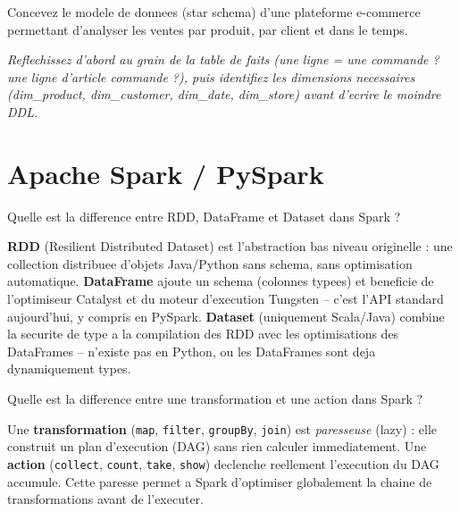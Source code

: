 \documentclass[11pt,a4paper]{article}
\begin{document}
\begin{coding}
Concevez le modele de donnees (star schema) d'une plateforme e-commerce permettant d'analyser les ventes par produit, par client et dans le temps.

\emph{Reflechissez d'abord au grain de la table de faits (une ligne = une commande ? une ligne d'article commande ?), puis identifiez les dimensions necessaires (dim\_product, dim\_customer, dim\_date, dim\_store) avant d'ecrire le moindre DDL.}
\end{coding}

\newpage
\section{Apache Spark / PySpark}

\begin{question} Quelle est la difference entre RDD, DataFrame et Dataset dans Spark ?
\end{question}
\begin{reponse}
\textbf{RDD} (Resilient Distributed Dataset) est l'abstraction bas niveau originelle : une collection distribuee d'objets Java/Python sans schema, sans optimisation automatique. \textbf{DataFrame} ajoute un schema (colonnes typees) et beneficie de l'optimiseur Catalyst et du moteur d'execution Tungsten -- c'est l'API standard aujourd'hui, y compris en PySpark. \textbf{Dataset} (uniquement Scala/Java) combine la securite de type a la compilation des RDD avec les optimisations des DataFrames -- n'existe pas en Python, ou les DataFrames sont deja dynamiquement types.
\end{reponse}

\begin{question} Quelle est la difference entre une transformation et une action dans Spark ?
\end{question}
\begin{reponse}
Une \textbf{transformation} (\texttt{map}, \texttt{filter}, \texttt{groupBy}, \texttt{join}) est \emph{paresseuse} (lazy) : elle construit un plan d'execution (DAG) sans rien calculer immediatement. Une \textbf{action} (\texttt{collect}, \texttt{count}, \texttt{take}, \texttt{show}) declenche reellement l'execution du DAG accumule. Cette paresse permet a Spark d'optimiser globalement la chaine de transformations avant de l'executer.
\end{reponse}
\end{document}
